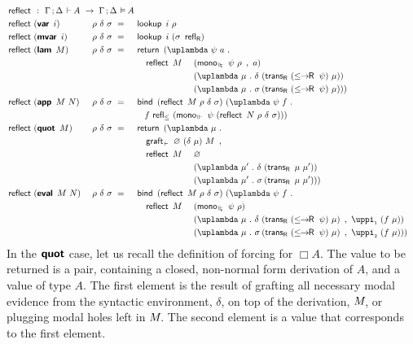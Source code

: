\documentclass[submission,copyright,creativecommons,sharealike,backref=page]{eptcs}
\newcommand{\sigmas}{\rlap{$\sigma$}\hphantom{\delta}}
\newcommand{\sA}{\mkern-2muA}
\newcommand{\R}{\mathrel{\rlap{$\mkern.75mu\textsf{R}$}\hphantom{\subseteq}}}
\newcommand{\Rs}{\mathrel{\textsf{R}}}
\renewcommand{\:}{\mathop{\mkern3mu:\mkern3mu}}
\renewcommand{\.}{\mathop{\mkern3mu.\mkern3mu}}
\renewcommand{\;}{\mathop{;}}
\renewcommand{\,}{\mathop{,}}
\newcommand{\unit}{\varnothing}
\newcommand{\e}{\mathrel{\mkern2mu\vdash\mkern1mu}}
\newcommand{\ee}{\mathrel{\mkern2mu\Vdash\mkern1mu}}
\newcommand{\ees}{\mathrel{\mkern2mu\Vdash_{\mkern-9mu\scriptscriptstyle{\star}}}}
\newcommand{\ef}{\mathrel{\mkern2mu\vDash\mkern1mu}}
\renewcommand{\r}{\mathrel{\rightarrow\mkern-1mu}}
\newcommand{\reflect}{\operatorname{\textsf{reflect}}}
\newcommand{\monoee}{\operatorname{\textsf{mono}_{\ee}}}
\newcommand{\monoees}{\operatorname{\textsf{mono}_{\ees}}}
\newcommand{\pii}{\operatorname{\uppi_{\scriptscriptstyle{1}}}}
\newcommand{\piii}{\operatorname{\uppi_{\scriptscriptstyle{2}}}}
\newcommand{\reflle}{\operatorname{\textsf{refl}_{\le}}}
\newcommand{\reflR}{\operatorname{\textsf{refl}_{\Rs}}}
\newcommand{\transR}{\operatorname{\textsf{trans}_{\Rs}}}
\newcommand{\lerR}{\operatorname{\le\mkern-1mu\r\mkern-1mu\R}}
\newcommand{\var}{\operatorname{\textsf{\textbf{var}}}}
\newcommand{\mvar}{\operatorname{\textsf{\textbf{mvar}}}}
\newcommand{\lam}{\operatorname{\textsf{\textbf{lam}}}}
\newcommand{\app}{\operatorname{\textsf{\textbf{app}}}}
\newcommand{\quot}{\operatorname{\textsf{\textbf{quot}}}}
\newcommand{\eval}{\operatorname{\textsf{\textbf{eval}}}}
\newcommand{\return}{\operatorname{\textsf{return}}}
\newcommand{\bind}{\operatorname{\textsf{bind}}}
\newcommand{\lookup}{\operatorname{\textsf{lookup}}}
\newcommand{\grafte}{\operatorname{\textsf{graft}_{\e}}}
\theoremstyle{mystyle}
\begin{document}
\begin{alignat*}{5}
  & \reflect ~\:~ \rlap{$\Gamma \; \Delta \e \sA ~\r~ \Gamma \; \Delta \ef \sA$}\\
  & \reflect~(\var~i)    && ~\rho~\delta~\sigma ~=~ && \lookup~\rlap{$i~\rho$}\\
  & \reflect~(\mvar~i)   && ~\rho~\delta~\sigma ~=~ && \lookup~\rlap{$i~(\sigma~\reflR)$}\\
  & \reflect~(\lam~M)    && ~\rho~\delta~\sigma ~=~ && \return~\rlap{$(\uplambda~\psi~a \.$}\\
  &                      &&                         && \quad \reflect~M~ &&(\monoees~\psi~\rho~\,~a)\\
  &                      &&                         &&                   &&(\uplambda~\mu \. \delta~(\transR~(\lerR~\psi)~\mu))\\
  &                      &&                         &&                   &&(\uplambda~\mu \. \sigmas~(\transR~(\lerR~\psi)~\mu)))\\
  & \reflect~(\app~M~N)  && ~\rho~\delta~\sigma ~=~ && \bind~\rlap{$(\reflect~M~\rho~\delta~\sigma)~(\uplambda~\psi~f \.$}\\
  &                      &&                          && \quad f~\rlap{$\reflle~(\monoee~\psi~(\reflect~N~\rho~\delta~\sigma)))$}\\
  & \reflect~(\quot~M)   && ~\rho~\delta~\sigma ~=~ && \return~\rlap{$(\uplambda~\mu \.$}\\
  &                      &&                         && \quad \grafte~\rlap{$\unit~(\delta~\mu)~M~\,$}\\
  &                      &&                         && \quad \reflect~M~ &&\unit\\                                
  &                      &&                         &&                   &&(\uplambda~\mu' \. \delta~(\transR~\mu~\mu'))\\
  &                      &&                         &&                   &&(\uplambda~\mu' \. \sigmas~(\transR~\mu~\mu')))\\
  & \reflect~(\eval~M~N) && ~\rho~\delta~\sigma ~=~ && \bind~\rlap{$(\reflect~M~\rho~\delta~\sigma)~(\uplambda~\psi~f \.$}\\
  &                      &&                         && \quad \reflect~M~ &&(\monoees~\psi~\rho)\\
  &                      &&                         &&                   &&(\uplambda~\mu \. \delta~(\transR~(\lerR~\psi)~\mu)~\,~\pii~(f~\mu))\\
  &                      &&                         &&                   &&(\uplambda~\mu \. \sigmas~(\transR~(\lerR~\psi)~\mu)~\,~\piii~(f~\mu)))
\end{alignat*}
In the $\quot$ case, let us recall the definition of forcing for $\Box A$.  The value to be returned is a pair, containing a closed, non-normal form derivation of $A$, and a value of type $A$.  The first element is the result of grafting all necessary modal evidence from the syntactic environment, $\delta$, on top of the derivation, $M\mkern-3mu$, or plugging modal holes left in $M\mkern-3mu$.  The second element is a value that corresponds to the first element. 
\end{document}
